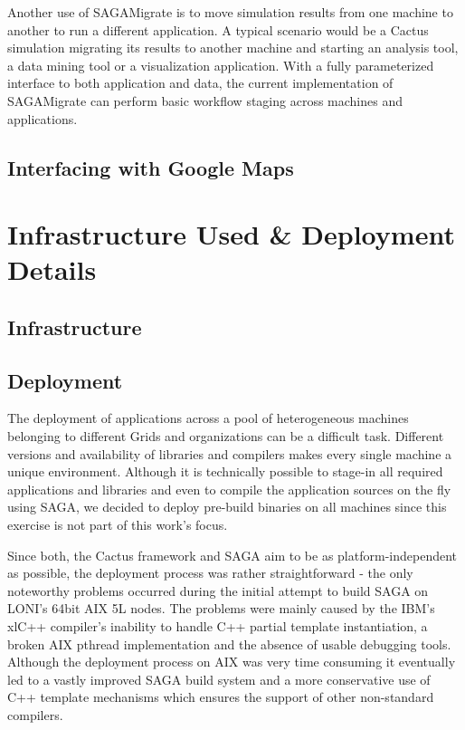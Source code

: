 \documentclass[conference,final]{IEEEtran}
\begin{document}
Another use of SAGAMigrate is to move simulation results from one
machine to another to run a different application. A typical scenario
would be a Cactus simulation migrating its results to another machine
and starting an analysis tool, a data mining tool or a visualization
application. With a fully parameterized interface to both application
and data, the current implementation of SAGAMigrate can perform basic
workflow staging across machines and applications.

\subsection{Interfacing with Google Maps}

\section{Infrastructure Used \& Deployment Details}

\subsection{Infrastructure}



\subsection{Deployment}

The deployment of applications across a pool of heterogeneous machines
belonging to different Grids and organizations can be a difficult
task. Different versions and availability of libraries and compilers
makes every single machine a unique environment. Although it is
technically possible to stage-in all required applications and
libraries and even to compile the application sources on the fly using
SAGA, we decided to deploy pre-build binaries on all machines since
this exercise is not part of this work's focus.

Since both, the Cactus framework and SAGA aim to be as
platform-independent as possible, the deployment process was rather
straightforward - the only noteworthy problems occurred during the
initial attempt to build SAGA on LONI's 64bit AIX 5L nodes. The
problems were mainly caused by the IBM's xlC++ compiler's inability to
handle C++ partial template instantiation, a broken AIX pthread
implementation and the absence of usable debugging tools. Although the
deployment process on AIX was very time consuming it eventually led to
a vastly improved SAGA build system and a more conservative use of C++
template mechanisms which ensures the support of other non-standard
compilers.
\end{document}
